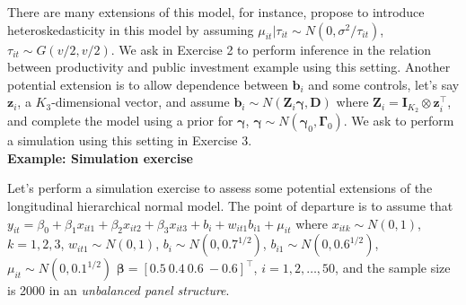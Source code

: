 There are many extensions of this model, for instance, \cite{Chib1999} propose to introduce heteroskedasticity in this model by assuming $\mu_{it}|\tau_{it}\sim N(0, \sigma^2/\tau_{it})$, $\tau_{it}\sim G(v/2,v/2)$. We ask in Exercise 2 to perform inference in the relation between productivity and public investment example using this setting. Another potential extension is to allow dependence between $\bm{b}_i$ and some controls, let's say $\bm{z}_i$, a $K_3$-dimensional vector, and assume $\bm{b}_i\sim N(\bm{Z}_i\bm{\gamma},\bm{D})$ where $\bm{Z}_i=\bm{I}_{K_2}\otimes \bm{z}_i^{\top}$, and complete the model using a prior for $\bm{\gamma}$, $\bm{\gamma}\sim N(\bm{\gamma}_0,\bm{\Gamma}_0)$. We ask to perform a simulation using this setting in Exercise 3.\\   

\textbf{Example: Simulation exercise}

Let's perform a simulation exercise to assess some potential extensions of the longitudinal hierarchical normal model. The point of departure is to assume that $y_{it}=\beta_0+\beta_1x_{it1}+\beta_2x_{it2}+\beta_3x_{it3}+b_i+w_{it1}b_{i1}+\mu_{it}$ where $x_{itk}\sim N(0,1)$, $k=1,2,3$, $w_{it1}\sim N(0,1)$, $b_i\sim N(0, 0.7^{1/2})$, $b_{i1}\sim N(0, 0.6^{1/2})$, $\mu_{it}\sim N(0, 0.1^{1/2})$ $\bm{\beta}=[0.5 \ 0.4 \ 0.6 \ -0.6]^{\top}$, $i=1,2,\dots,50$, and the sample size is 2000 in an \textit{unbalanced panel structure}. 

